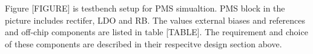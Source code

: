 \documentclass[12pt,a4paper,UKenglish]{article}
\begin{document}
Figure [FIGURE] is testbench setup for PMS simualtion. PMS block in the picture includes rectifer, LDO and RB. The values external 
biases and references and off-chip components are listed in table [TABLE]. The requirement and choice of these components 
are described in their respecitve design section above.



\clearpage
\newpage
\nocite{*}
\printbibliography

\newpage
\listoffigures

\newpage
\listoftables

\newpage
\printnoidxglossaries
\end{document}
